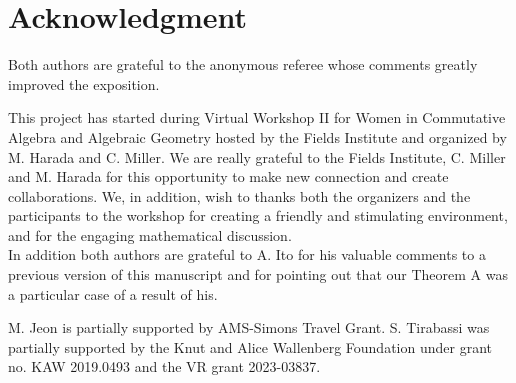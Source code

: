 \documentclass[11pt,letter]{amsart}
\numberwithin{equation}{section}
\begin{document}
%
%
%
%
\section*{Acknowledgment}
Both authors are grateful to the anonymous referee whose comments greatly improved the exposition. \par

This project has started during Virtual Workshop II for Women in Commutative Algebra and Algebraic Geometry hosted by the Fields Institute and organized by M. Harada and C. Miller. We are really grateful to the Fields Institute, C. Miller and M. Harada for this opportunity to make new connection and create collaborations. We, in addition, wish to thanks both the organizers and the participants to the workshop for creating a friendly and stimulating environment, and for the engaging mathematical discussion.\\
In addition both authors are grateful to A. Ito for his valuable comments to a previous version of this manuscript and for pointing out that our Theorem A was a particular case of a result of his.\par


 M. Jeon is partially supported by AMS-Simons Travel Grant. S. Tirabassi was partially supported by the Knut and Alice Wallenberg Foundation under grant no. KAW 2019.0493 and the VR grant 2023-03837.


\end{document}
